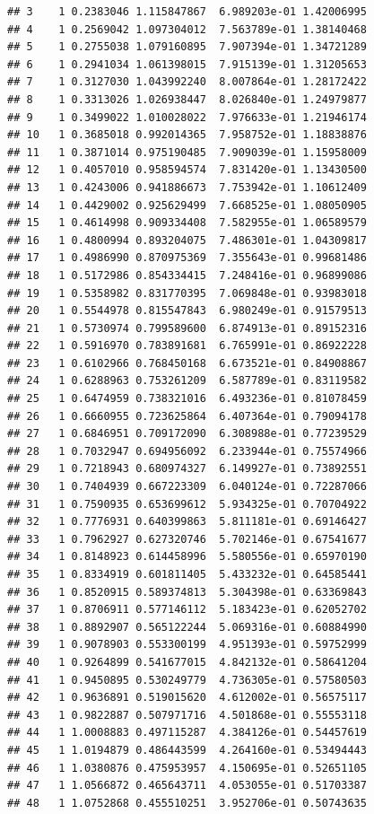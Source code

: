 \documentclass[article]{jss}\usepackage[]{graphicx}\usepackage[]{xcolor}
\makeatletter
\newenvironment{kframe}{%
 \def\at@end@of@kframe{}%
 \ifinner\ifhmode%
  \def\at@end@of@kframe{\end{minipage}}%
  \begin{minipage}{\columnwidth}%
 \fi\fi%
 \def\FrameCommand##1{\hskip\@totalleftmargin \hskip-\fboxsep
 \colorbox{shadecolor}{##1}\hskip-\fboxsep
     \hskip-\linewidth \hskip-\@totalleftmargin \hskip\columnwidth}%
 \MakeFramed {\advance\hsize-\width
   \@totalleftmargin\z@ \linewidth\hsize
   \@setminipage}}%
 {\par\unskip\endMakeFramed%
 \at@end@of@kframe}
\newenvironment{knitrout}{}{} %
\makeatother
\begin{document}
\begin{knitrout}
\begin{kframe}
\begin{verbatim}
## 3    1 0.2383046 1.115847867  6.989203e-01 1.42006995
## 4    1 0.2569042 1.097304012  7.563789e-01 1.38140468
## 5    1 0.2755038 1.079160895  7.907394e-01 1.34721289
## 6    1 0.2941034 1.061398015  7.915139e-01 1.31205653
## 7    1 0.3127030 1.043992240  8.007864e-01 1.28172422
## 8    1 0.3313026 1.026938447  8.026840e-01 1.24979877
## 9    1 0.3499022 1.010028022  7.976633e-01 1.21946174
## 10   1 0.3685018 0.992014365  7.958752e-01 1.18838876
## 11   1 0.3871014 0.975190485  7.909039e-01 1.15958009
## 12   1 0.4057010 0.958594574  7.831420e-01 1.13430500
## 13   1 0.4243006 0.941886673  7.753942e-01 1.10612409
## 14   1 0.4429002 0.925629499  7.668525e-01 1.08050905
## 15   1 0.4614998 0.909334408  7.582955e-01 1.06589579
## 16   1 0.4800994 0.893204075  7.486301e-01 1.04309817
## 17   1 0.4986990 0.870975369  7.355643e-01 0.99681486
## 18   1 0.5172986 0.854334415  7.248416e-01 0.96899086
## 19   1 0.5358982 0.831770395  7.069848e-01 0.93983018
## 20   1 0.5544978 0.815547843  6.980249e-01 0.91579513
## 21   1 0.5730974 0.799589600  6.874913e-01 0.89152316
## 22   1 0.5916970 0.783891681  6.765991e-01 0.86922228
## 23   1 0.6102966 0.768450168  6.673521e-01 0.84908867
## 24   1 0.6288963 0.753261209  6.587789e-01 0.83119582
## 25   1 0.6474959 0.738321016  6.493236e-01 0.81078459
## 26   1 0.6660955 0.723625864  6.407364e-01 0.79094178
## 27   1 0.6846951 0.709172090  6.308988e-01 0.77239529
## 28   1 0.7032947 0.694956092  6.233944e-01 0.75574966
## 29   1 0.7218943 0.680974327  6.149927e-01 0.73892551
## 30   1 0.7404939 0.667223309  6.040124e-01 0.72287066
## 31   1 0.7590935 0.653699612  5.934325e-01 0.70704922
## 32   1 0.7776931 0.640399863  5.811181e-01 0.69146427
## 33   1 0.7962927 0.627320746  5.702146e-01 0.67541677
## 34   1 0.8148923 0.614458996  5.580556e-01 0.65970190
## 35   1 0.8334919 0.601811405  5.433232e-01 0.64585441
## 36   1 0.8520915 0.589374813  5.304398e-01 0.63369843
## 37   1 0.8706911 0.577146112  5.183423e-01 0.62052702
## 38   1 0.8892907 0.565122244  5.069316e-01 0.60884990
## 39   1 0.9078903 0.553300199  4.951393e-01 0.59752999
## 40   1 0.9264899 0.541677015  4.842132e-01 0.58641204
## 41   1 0.9450895 0.530249779  4.736305e-01 0.57580503
## 42   1 0.9636891 0.519015620  4.612002e-01 0.56575117
## 43   1 0.9822887 0.507971716  4.501868e-01 0.55553118
## 44   1 1.0008883 0.497115287  4.384126e-01 0.54457619
## 45   1 1.0194879 0.486443599  4.264160e-01 0.53494443
## 46   1 1.0380876 0.475953957  4.150695e-01 0.52651105
## 47   1 1.0566872 0.465643711  4.053055e-01 0.51703387
## 48   1 1.0752868 0.455510251  3.952706e-01 0.50743635

\end{verbatim}
\end{kframe}
\end{knitrout}
\end{document}
